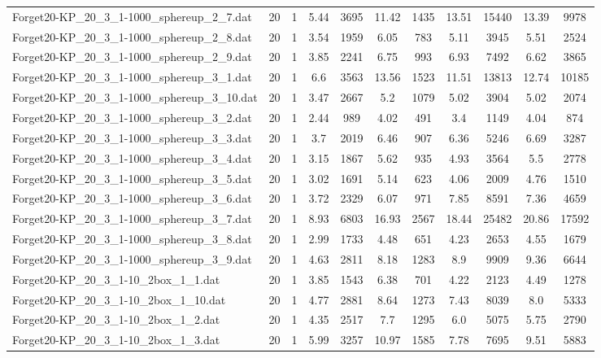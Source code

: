 \begin{table}[!ht]
\begin{tabular}{lcccccccccc}
Forget20-KP\_20\_3\_1-1000\_sphereup\_2\_7.dat & 20 & 1 & 5.44 & 3695 & 11.42 & 1435 & 13.51 & 15440 & 13.39 & 9978 \\
Forget20-KP\_20\_3\_1-1000\_sphereup\_2\_8.dat & 20 & 1 & 3.54 & 1959 & 6.05 & 783 & 5.11 & 3945 & 5.51 & 2524 \\
Forget20-KP\_20\_3\_1-1000\_sphereup\_2\_9.dat & 20 & 1 & 3.85 & 2241 & 6.75 & 993 & 6.93 & 7492 & 6.62 & 3865 \\
Forget20-KP\_20\_3\_1-1000\_sphereup\_3\_1.dat & 20 & 1 & 6.6 & 3563 & 13.56 & 1523 & 11.51 & 13813 & 12.74 & 10185 \\
Forget20-KP\_20\_3\_1-1000\_sphereup\_3\_10.dat & 20 & 1 & 3.47 & 2667 & 5.2 & 1079 & 5.02 & 3904 & 5.02 & 2074 \\
Forget20-KP\_20\_3\_1-1000\_sphereup\_3\_2.dat & 20 & 1 & 2.44 & 989 & 4.02 & 491 & 3.4 & 1149 & 4.04 & 874 \\
Forget20-KP\_20\_3\_1-1000\_sphereup\_3\_3.dat & 20 & 1 & 3.7 & 2019 & 6.46 & 907 & 6.36 & 5246 & 6.69 & 3287 \\
Forget20-KP\_20\_3\_1-1000\_sphereup\_3\_4.dat & 20 & 1 & 3.15 & 1867 & 5.62 & 935 & 4.93 & 3564 & 5.5 & 2778 \\
Forget20-KP\_20\_3\_1-1000\_sphereup\_3\_5.dat & 20 & 1 & 3.02 & 1691 & 5.14 & 623 & 4.06 & 2009 & 4.76 & 1510 \\
Forget20-KP\_20\_3\_1-1000\_sphereup\_3\_6.dat & 20 & 1 & 3.72 & 2329 & 6.07 & 971 & 7.85 & 8591 & 7.36 & 4659 \\
Forget20-KP\_20\_3\_1-1000\_sphereup\_3\_7.dat & 20 & 1 & 8.93 & 6803 & 16.93 & 2567 & 18.44 & 25482 & 20.86 & 17592 \\
Forget20-KP\_20\_3\_1-1000\_sphereup\_3\_8.dat & 20 & 1 & 2.99 & 1733 & 4.48 & 651 & 4.23 & 2653 & 4.55 & 1679 \\
Forget20-KP\_20\_3\_1-1000\_sphereup\_3\_9.dat & 20 & 1 & 4.63 & 2811 & 8.18 & 1283 & 8.9 & 9909 & 9.36 & 6644 \\
Forget20-KP\_20\_3\_1-10\_2box\_1\_1.dat & 20 & 1 & 3.85 & 1543 & 6.38 & 701 & 4.22 & 2123 & 4.49 & 1278 \\
Forget20-KP\_20\_3\_1-10\_2box\_1\_10.dat & 20 & 1 & 4.77 & 2881 & 8.64 & 1273 & 7.43 & 8039 & 8.0 & 5333 \\
Forget20-KP\_20\_3\_1-10\_2box\_1\_2.dat & 20 & 1 & 4.35 & 2517 & 7.7 & 1295 & 6.0 & 5075 & 5.75 & 2790 \\
Forget20-KP\_20\_3\_1-10\_2box\_1\_3.dat & 20 & 1 & 5.99 & 3257 & 10.97 & 1585 & 7.78 & 7695 & 9.51 & 5883 \\

\end{tabular}
\end{table}
